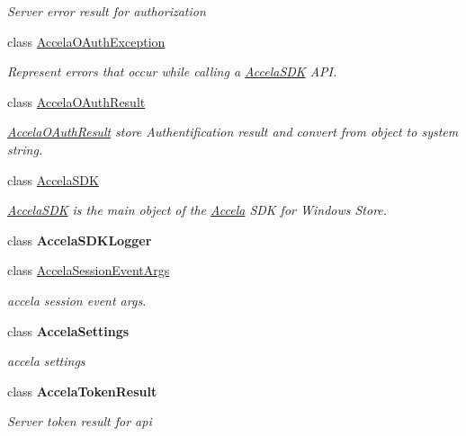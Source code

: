 \begin{DoxyCompactItemize}
\begin{DoxyCompactList}\small\item\em Server error result for authorization \end{DoxyCompactList}\item 
class \hyperlink{class_accela_1_1_windows_store_s_d_k_1_1_accela_o_auth_exception}{Accela\+O\+Auth\+Exception}
\begin{DoxyCompactList}\small\item\em Represent errors that occur while calling a \hyperlink{class_accela_1_1_windows_store_s_d_k_1_1_accela_s_d_k}{Accela\+S\+D\+K} A\+P\+I. \end{DoxyCompactList}\item 
class \hyperlink{class_accela_1_1_windows_store_s_d_k_1_1_accela_o_auth_result}{Accela\+O\+Auth\+Result}
\begin{DoxyCompactList}\small\item\em \hyperlink{class_accela_1_1_windows_store_s_d_k_1_1_accela_o_auth_result}{Accela\+O\+Auth\+Result} store Authentification result and convert from object to system string. \end{DoxyCompactList}\item 
class \hyperlink{class_accela_1_1_windows_store_s_d_k_1_1_accela_s_d_k}{Accela\+S\+D\+K}
\begin{DoxyCompactList}\small\item\em \hyperlink{class_accela_1_1_windows_store_s_d_k_1_1_accela_s_d_k}{Accela\+S\+D\+K} is the main object of the \hyperlink{namespace_accela}{Accela} S\+D\+K for Windows Store. \end{DoxyCompactList}\item 
class {\bfseries Accela\+S\+D\+K\+Logger}
\item 
class \hyperlink{class_accela_1_1_windows_store_s_d_k_1_1_accela_session_event_args}{Accela\+Session\+Event\+Args}
\begin{DoxyCompactList}\small\item\em accela session event args. \end{DoxyCompactList}\item 
class {\bfseries Accela\+Settings}
\begin{DoxyCompactList}\small\item\em accela settings \end{DoxyCompactList}\item 
class {\bfseries Accela\+Token\+Result}
\begin{DoxyCompactList}\small\item\em Server token result for api \end{DoxyCompactList}\item 

\end{DoxyCompactItemize}

